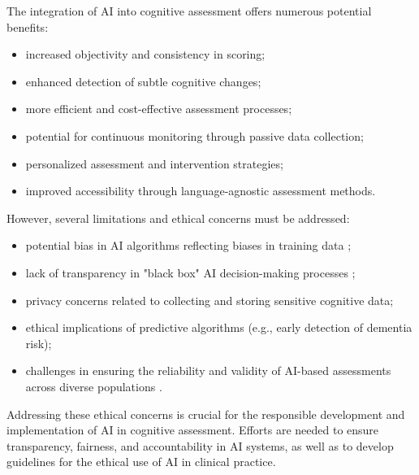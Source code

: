 The integration of AI into cognitive assessment offers numerous potential benefits:
\begin{itemize}
\item increased objectivity and consistency in scoring;
\item enhanced detection of subtle cognitive changes;
\item more efficient and cost-effective assessment processes;
\item potential for continuous monitoring through passive data collection;
\item personalized assessment and intervention strategies;
\item improved accessibility through language-agnostic assessment methods.
\end{itemize}

However, several limitations and ethical concerns must be addressed:
\begin{itemize}
\item potential bias in AI algorithms reflecting biases in training data \cite{Birhane2021};
\item lack of transparency in "black box" AI decision-making processes \cite{Rudin2019};
\item privacy concerns related to collecting and storing sensitive cognitive data;
\item ethical implications of predictive algorithms (e.g., early detection of dementia risk);
\item challenges in ensuring the reliability and validity of AI-based assessments across diverse populations \cite{Gianfrancesco2018}.
\end{itemize}

Addressing these ethical concerns is crucial for the responsible development and implementation of AI in cognitive assessment. Efforts are needed to ensure transparency, fairness, and accountability in AI systems, as well as to develop guidelines for the ethical use of AI in clinical practice.

